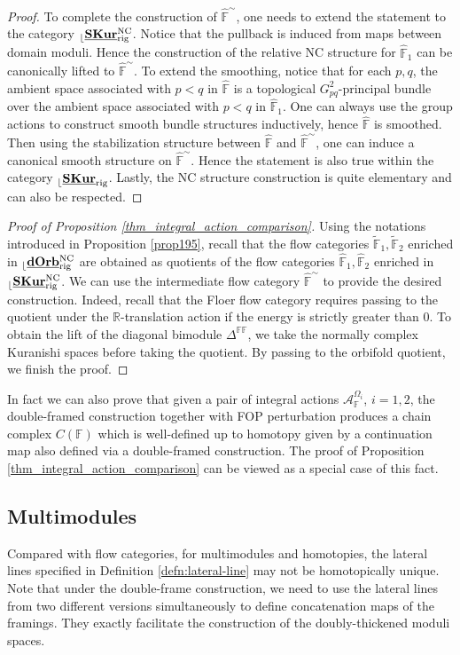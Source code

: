 \documentclass[reqno, 10pt]{amsart}
\numberwithin{equation}{section}
\numberwithin{equation}{section}
\theoremstyle{definition}
\theoremstyle{remark}
\newcommand{\mb}{\mathbb}
\newcommand{\mc}{\mathcal}
\renewcommand{\outer}{{}_{\lfloor}}
\newcommand{\uds}[1]{\underline{\smash{#1}}}
\begin{document}
\begin{proof}
To complete the construction of $\hat {\mb F}^\sim$, one needs to extend the statement to the category $\outer \uds{\bf SKur}_{\rm rig}^{\rm NC}$. Notice that the pullback is induced from maps between domain moduli. Hence the construction of the relative NC structure for $\hat {\mb F}_1$ can be canonically lifted to $\hat {\mb F}^\sim$. To extend the smoothing, notice that for each $p, q$, the ambient space associated with $p < q$ in $\hat{\mb F}$ is a topological $G_{pq}^2$-principal bundle over the ambient space associated with $p < q$ in $\hat{\mb F}_1$. One can always use the group actions to construct smooth bundle structures inductively, hence $\hat {\mb F}$ is smoothed. Then using the stabilization structure between $\hat {\mb F}$ and $\hat {\mb F}^\sim$, one can induce a canonical smooth structure on $\hat {\mb F}^\sim$. Hence the statement is also true within the category $\outer \uds{\bf SKur}_{\rm rig}$. Lastly, the NC structure construction is quite elementary and can also be respected. 
\end{proof}

\begin{proof}[Proof of Proposition \ref{thm_integral_action_comparison}]
    Using the notations introduced in Proposition \ref{prop195}, recall that the flow categories $\tilde{\mb F}_1, \tilde{\mb F}_2$ enriched in $\outer \uds{\bf dOrb}_{\rm rig}^{\rm NC}$ are obtained as quotients of the flow categories $\hat{\mb F}_1, \hat{\mb F}_2$ enriched in $\outer \uds{\bf SKur}_{\rm rig}^{\rm NC}$. We can use the intermediate flow category $\hat{\mb F}^{\sim}$ to provide the desired construction. Indeed, recall that the Floer flow category requires passing to the quotient under the ${\mb R}$-translation action if the energy is strictly greater than $0$. To obtain the lift of the diagonal bimodule $\mb{\Delta}^{\mb{FF}}$, we take the normally complex Kuranishi spaces before taking the quotient. By passing to the orbifold quotient, we finish the proof.
\end{proof}

In fact we can also prove that given a pair of integral actions ${\mc A}_{\mb F}^{\Omega_i}$, $i = 1, 2$, the double-framed construction together with FOP perturbation produces a chain complex $C({\mb F})$ which is well-defined up to homotopy given by a continuation map also defined via a double-framed construction. The proof of Proposition \ref{thm_integral_action_comparison} can be viewed as a special case of this fact. 


\subsection{Multimodules}\label{subsection_comparison_lateral_line}
Compared with flow categories, for multimodules and homotopies, the lateral lines specified in Definition \ref{defn:lateral-line} may not be homotopically unique. Note that under the double-frame construction, we need to use the lateral lines from two different versions simultaneously to define concatenation maps of the framings. They exactly facilitate the construction of the doubly-thickened moduli spaces.
\end{document}
